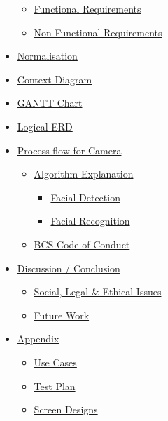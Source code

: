 \documentclass[
  english,
  a4paper,
,tablecaptionabove
]{scrartcl}
\providecommand{\tightlist}{%
  \setlength{\itemsep}{0pt}\setlength{\parskip}{0pt}}
\begin{document}
\begin{itemize}
  \begin{itemize}
  \tightlist
  \item
    \protect\hyperlink{functional-requirements}{Functional Requirements}
  \item
    \protect\hyperlink{non-functional-requirements}{Non-Functional
    Requirements}
  \end{itemize}
\item
  \protect\hyperlink{normalisation}{Normalisation}
\item
  \protect\hyperlink{context-diagram}{Context Diagram}
\item
  \protect\hyperlink{gantt-chart}{GANTT Chart}
\item
  \protect\hyperlink{logical-erd}{Logical ERD}
\item
  \protect\hyperlink{process-flow-for-camera}{Process flow for Camera}

  \begin{itemize}
  \tightlist
  \item
    \protect\hyperlink{algorithm-explanation}{Algorithm Explanation}

    \begin{itemize}
    \tightlist
    \item
      \protect\hyperlink{facial-detection}{Facial Detection}
    \item
      \protect\hyperlink{facial-recognition}{Facial Recognition}
    \end{itemize}
  \item
    \protect\hyperlink{bcs-code-of-conduct}{BCS Code of Conduct}
  \end{itemize}
\item
  \protect\hyperlink{discussion--conclusion}{Discussion / Conclusion}

  \begin{itemize}
  \tightlist
  \item
    \protect\hyperlink{social-legal--ethical-issues}{Social, Legal \&
    Ethical Issues}
  \item
    \protect\hyperlink{future-work}{Future Work}
  \end{itemize}
\item
  \protect\hyperlink{appendix}{Appendix}

  \begin{itemize}
  \tightlist
  \item
    \protect\hyperlink{use-cases}{Use Cases}
  \item
    \protect\hyperlink{test-plan}{Test Plan}
  \item
    \protect\hyperlink{screen-designs}{Screen Designs}


\end{itemize}
\end{itemize}
\end{document}
